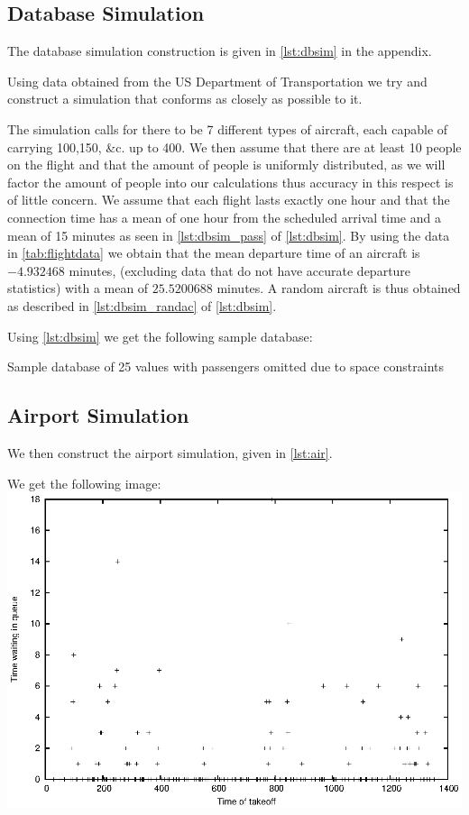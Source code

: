\documentclass[titlepage]{article}
\numberwithin{equation}{section}
\begin{document}
\subsection{Database Simulation}
The database simulation construction is given in \autoref{lst:dbsim} in the appendix.

Using data obtained from the US Department of Transportation \cite{USDoTData} we try and construct a simulation that conforms as closely as possible to it. 

The simulation calls for there to be 7 different types of aircraft, each capable of carrying 100,150, \&c. up to 400. We then assume that there are  at least 10 people on the flight and that the amount of people is uniformly distributed, as we will factor the amount of people into our calculations thus accuracy in this respect is of little concern.
We assume that each flight lasts exactly one hour and that the connection time has a mean of one hour from the scheduled arrival time and a mean of 15 minutes as seen in \autoref{lst:dbsim_pass} of \autoref{lst:dbsim}. By using the data in \autoref{tab:flightdata} we obtain that the mean departure time of an aircraft is $-4.932468$ minutes, (excluding data that do not have accurate departure statistics) with a mean of $25.5200688$ minutes. A random aircraft is thus obtained as described in \autoref{lst:dbsim_randac} of \autoref{lst:dbsim}.

Using \autoref{lst:dbsim} we get the following sample database:

\begin{table}[h!]
\caption{Sample database of 25 values with passengers omitted due to space constraints}
\label{tab:sampledata}
\centering
{}
\end{table}

\subsection{Airport Simulation}
We then construct the airport simulation, given in \autoref{lst:air}.

We get the following image:
\includegraphics{test.eps}
\end{document}
